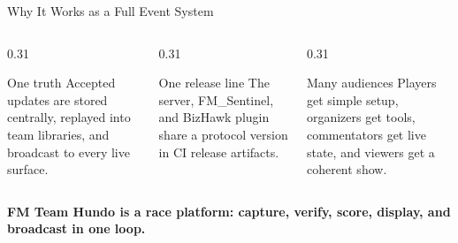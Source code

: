 \documentclass[aspectratio=169,11pt]{beamer}
\begin{document}
\begin{frame}{Why It Works as a Full Event System}
  \begin{columns}[T,onlytextwidth]
    \begin{column}{0.31\textwidth}
      \begin{block}{One truth}
        Accepted updates are stored centrally, replayed into team libraries, and broadcast to every live surface.
      \end{block}
    \end{column}
    \begin{column}{0.31\textwidth}
      \begin{block}{One release line}
        The server, FM\_Sentinel, and BizHawk plugin share a protocol version in CI release artifacts.
      \end{block}
    \end{column}
    \begin{column}{0.31\textwidth}
      \begin{block}{Many audiences}
        Players get simple setup, organizers get tools, commentators get live state, and viewers get a coherent show.
      \end{block}
    \end{column}
  \end{columns}

  \vspace{0.45cm}
  \begin{center}
    \Large\textbf{FM Team Hundo is a race platform: capture, verify, score, display, and broadcast in one loop.}
  \end{center}
\end{frame}
\end{document}

